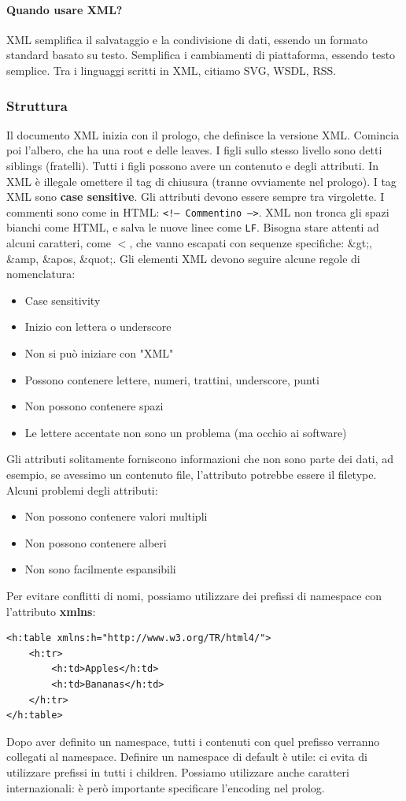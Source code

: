 \documentclass[11pt]{article}
\newcommand{\code}[1]{\texttt{#1}}
\begin{document}
\paragraph{Quando usare XML?} XML semplifica il salvataggio e la condivisione di dati, essendo un formato standard basato su testo. Semplifica i cambiamenti di piattaforma, essendo testo semplice. Tra i linguaggi scritti in XML, citiamo SVG, WSDL, RSS.
\subsubsection{Struttura}
Il documento XML inizia con il prologo, che definisce la versione XML. Comincia poi l'albero, che ha una root e delle leaves. I figli sullo stesso livello sono detti siblings (fratelli). Tutti i figli possono avere un contenuto e degli attributi. In XML è illegale omettere il tag di chiusura (tranne ovviamente nel prologo). I tag XML sono \textbf{case sensitive}. Gli attributi devono essere sempre tra virgolette. I commenti sono come in HTML: \code{<!-- Commentino -->}. XML non tronca gli spazi bianchi come HTML, e salva le nuove linee come \code{LF}. Bisogna stare attenti ad alcuni caratteri, come $<$, che vanno escapati con sequenze specifiche: \&gt;, \&amp, \&apos, \&quot;. Gli elementi XML devono seguire alcune regole di nomenclatura:
\begin{itemize}
    \item Case sensitivity
    \item Inizio con lettera o underscore
    \item Non si può iniziare con "XML"
    \item Possono contenere lettere, numeri, trattini, underscore, punti
    \item Non possono contenere spazi 
    \item Le lettere accentate non sono un problema (ma occhio ai software)
\end{itemize}
Gli attributi solitamente forniscono informazioni che non sono parte dei dati, ad esempio, se avessimo un contenuto file, l'attributo potrebbe essere il filetype. Alcuni problemi degli attributi:
\begin{itemize}
    \item Non possono contenere valori multipli
    \item Non possono contenere alberi 
    \item Non sono facilmente espansibili
\end{itemize}
Per evitare conflitti di nomi, possiamo utilizzare dei prefissi di namespace con l'attributo \textbf{xmlns}:
\begin{verbatim}
<h:table xmlns:h="http://www.w3.org/TR/html4/"> 
    <h:tr>
        <h:td>Apples</h:td>
        <h:td>Bananas</h:td>
    </h:tr>
</h:table>
\end{verbatim}
Dopo aver definito un namespace, tutti i contenuti con quel prefisso verranno collegati al namespace. Definire un namespace di default è utile: ci evita di utilizzare prefissi in tutti i children. 
Possiamo utilizzare anche caratteri internazionali: è però importante specificare l'encoding nel prolog. 
\end{document}
